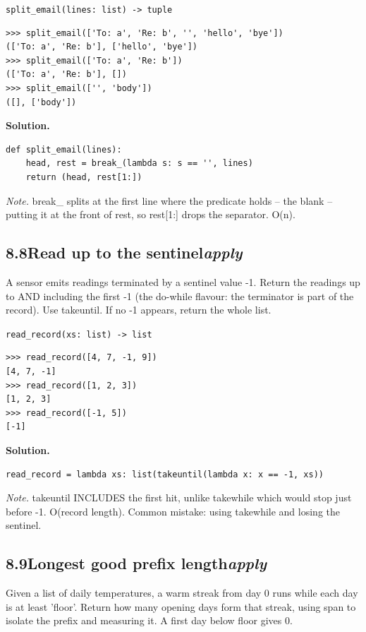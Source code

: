 \documentclass[10pt,letterpaper]{book}
\begin{document}
\noindent\texttt{split\_email(lines: list) -> tuple}
\begin{lstlisting}[style=ex]
>>> split_email(['To: a', 'Re: b', '', 'hello', 'bye'])
(['To: a', 'Re: b'], ['hello', 'bye'])
>>> split_email(['To: a', 'Re: b'])
(['To: a', 'Re: b'], [])
>>> split_email(['', 'body'])
([], ['body'])
\end{lstlisting}
\noindent\textbf{Solution.}
\begin{lstlisting}[style=code]
def split_email(lines):
    head, rest = break_(lambda s: s == '', lines)
    return (head, rest[1:])
\end{lstlisting}
\noindent\textit{Note.} break\_ splits at the first line where the predicate holds -- the blank -- putting it at the front of rest, so rest[1:] drops the separator. O(n).


\subsection*{8.8\quad Read up to the sentinel\hfill\textnormal{\textit{apply}}}
A sensor emits readings terminated by a sentinel value -1. Return the readings up to AND including the first -1 (the do-while flavour: the terminator is part of the record). Use takeuntil. If no -1 appears, return the whole list.

\noindent\texttt{read\_record(xs: list) -> list}
\begin{lstlisting}[style=ex]
>>> read_record([4, 7, -1, 9])
[4, 7, -1]
>>> read_record([1, 2, 3])
[1, 2, 3]
>>> read_record([-1, 5])
[-1]
\end{lstlisting}
\noindent\textbf{Solution.}
\begin{lstlisting}[style=code]
read_record = lambda xs: list(takeuntil(lambda x: x == -1, xs))
\end{lstlisting}
\noindent\textit{Note.} takeuntil INCLUDES the first hit, unlike takewhile which would stop just before -1. O(record length). Common mistake: using takewhile and losing the sentinel.

\subsection*{8.9\quad Longest good prefix length\hfill\textnormal{\textit{apply}}}
Given a list of daily temperatures, a warm streak from day 0 runs while each day is at least 'floor'. Return how many opening days form that streak, using span to isolate the prefix and measuring it. A first day below floor gives 0.
\end{document}
